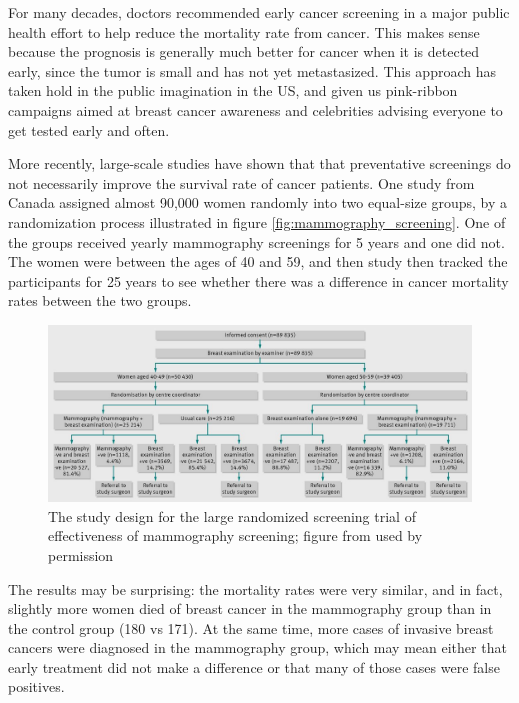 \documentclass[
]{book}
\theoremstyle{definition}
\theoremstyle{definition}
\theoremstyle{definition}
\theoremstyle{remark}
\begin{document}
For many decades, doctors recommended early cancer screening in a major public health effort to help reduce the mortality rate from cancer. This makes sense because the prognosis is generally much better for cancer when it is detected early, since the tumor is small and has not yet metastasized. This approach has taken hold in the public imagination in the US, and given us pink-ribbon campaigns aimed at breast cancer awareness and celebrities advising everyone to get tested early and often.

More recently, large-scale studies have shown that that preventative screenings do not necessarily improve the survival rate of cancer patients. One study from Canada \citep{miller_twenty_2014} assigned almost 90,000 women randomly into two equal-size groups, by a randomization process illustrated in figure \ref{fig:mammography_screening}. One of the groups received yearly mammography screenings for 5 years and one did not. The women were between the ages of 40 and 59, and then study then tracked the participants for 25 years to see whether there was a difference in cancer mortality rates between the two groups.

\begin{figure}
\centering
\includegraphics{ch7/mammography_screening.png}
\caption{The study design for the large randomized screening trial of effectiveness of mammography screening; figure from \citep{miller_twenty_2014} used by permission}
\end{figure}

The results may be surprising: the mortality rates were very similar, and in fact, slightly more women died of breast cancer in the mammography group than in the control group (180 vs 171). At the same time, more cases of invasive breast cancers were diagnosed in the mammography group, which may mean either that early treatment did not make a difference or that many of those cases were false positives.
\end{document}
